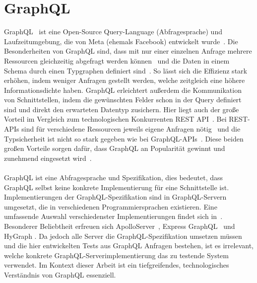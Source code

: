 \section{GraphQL}
\label{graphql}

GraphQL~\cite{graphqlspecification} ist eine Open-Source Query-Language (Abfragesprache) und Laufzeitumgebung, die von Meta (ehemals Facebook) entwickelt wurde~\cite[vgl. Introduction]{graphqlspecification}.
Die Besonderheiten von GraphQL sind, dass mit nur einer einzelnen Anfrage mehrere Ressourcen gleichzeitig abgefragt werden können~\cite[vgl. No More Over- and Underfetching]{howtographql} und die
Daten in einem Schema durch einen Typgraphen definiert sind~\cite[vgl. Benefits of a Schema \& Type System]{howtographql}.
So lässt sich die Effizienz stark erhöhen, indem weniger Anfragen gestellt werden, welche zeitgleich eine höhere Informationsdichte haben.
GraphQL erleichtert außerdem die Kommunikation von Schnittstellen, indem die gewünschten Felder schon in der Query definiert sind und direkt den erwarteten Datentyp zusichern.
Hier liegt auch der große Vorteil im Vergleich zum technologischen Konkurrenten  REST API~\cite[vgl. Welche REST-Einschränkungen versucht GraphQL zu überwinden?]{awsrestgraphql}.
Bei REST-APIs sind für verschiedene Ressourcen jeweils eigene Anfragen nötig~\cite[vgl. No More Over- and Underfetching]{howtographql} und die Typsicherheit ist nicht so stark gegeben
wie bei GraphQL-APIs~\cite[vgl. Zusammenfassung der Unterschiede: REST vs. GraphQL]{awsrestgraphql}.
Diese beiden großen Vorteile sorgen dafür, dass GraphQL an Popularität gewinnt und zunehmend eingesetzt wird~\cite[vgl. Continued growth and the road ahead]{graphql-growing-report}.
\\
\\
GraphQL ist eine Abfragesprache und Spezifikation, dies bedeutet, dass GraphQL selbst keine konkrete Implementierung für eine Schnittstelle ist.
Implementierungen der GraphQL-Spezifikation sind in GraphQL-Servern umgesetzt, die in verschiedenen Programmiersprachen existieren.
Eine umfassende Auswahl verschiedenster Implementierungen findet sich in~\cite{gqlimplementation}.
Besonderer Beliebtheit erfreuen sich ApolloServer~\cite{apolloqgl}, Express GraphQL~\cite{expressgql} und HyGraph \cite{hygql}.
Da jedoch alle Server die GraphQL-Spezifikation umsetzen müssen und die hier entwickelten Tests aus GraphQL Anfragen bestehen, ist es irrelevant, welche konkrete GraphQL-Serverimplementierung das zu testende System verwendet.
Im Kontext dieser Arbeit ist ein tiefgreifendes, technologisches Verständnis von GraphQL essenziell.

